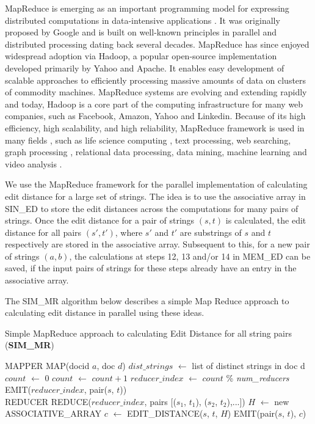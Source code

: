 \documentclass[conference]{IEEEtran}
\begin{document}
MapReduce is emerging as an important programming model for expressing distributed computations in data-intensive applications \cite{incmr}. It was originally proposed by Google and is built on well-known principles in parallel and distributed processing dating back several decades. MapReduce has since enjoyed widespread adoption via Hadoop, a popular open-source implementation developed primarily by Yahoo and Apache. It enables easy development of scalable approaches to efficiently processing massive amounts of data on clusters of commodity machines. MapReduce systems are evolving and extending rapidly and today, Hadoop is a core part of the computing infrastructure for many web companies, such as Facebook, Amazon, Yahoo and Linkedin. Because of its high efficiency, high scalability, and high reliability, MapReduce framework is used in many fields \cite{incmr}, such as life science computing \cite{lifescience}, text processing, web searching, graph processing \cite{graph}, relational data processing, data mining, machine learning \cite{svm} and video analysis \cite{video}.

We use the MapReduce framework for the parallel implementation of calculating edit distance for a large set of strings. The idea is to use the associative array in SIN\_ED to store the edit distances across the computations for many pairs of strings. Once the edit distance for a pair of strings $(s, t)$ is calculated, the edit distance for all pairs $(s', t')$, where $s'$ and $t'$ are substrings of $s$ and $t$ respectively are stored in the associative array. Subsequent to this, for a new pair of strings $(a, b)$, the calculations at steps 12, 13 and/or 14 in MEM\_ED can be saved, if the input pairs of strings for these steps already have an entry in the associative array.

The SIM\_MR algorithm below describes a simple Map Reduce approach to calculating edit distance in parallel using these ideas.

\begin{algorithm}
\caption{Simple MapReduce approach to calculating Edit Distance for all string pairs (\textbf{SIM\_MR})}
\begin{algorithmic}[1]
\class MAPPER
    \method MAP(docid $a$, doc $d$)
        \State $dist\_strings$ $\leftarrow$ list of distinct strings in doc d
        \State $count$ $\leftarrow$ 0
            \State $count$ $\leftarrow$ $count + 1$
            \State $reducer\_index$ $\leftarrow$ $count$ \% \textit{num\_reducers}
            \State EMIT($reducer\_index$, pair($s$, $t$))
        \EndFor
    \endmethod
\endclass\\

\class REDUCER
    \method REDUCE($reducer\_index$, pairs [($s_1$, $t_1$), ($s_2$, $t_2$),...])
        \State $H$ $\leftarrow$ new ASSOCIATIVE\_ARRAY
            \State $c$ $\leftarrow$ EDIT\_DISTANCE($s$, $t$, $H$)
            \State EMIT(pair($s$, $t$), $c$)
        \EndFor
    \endmethod
\endclass

\end{algorithmic}
\end{algorithm}
\end{document}
